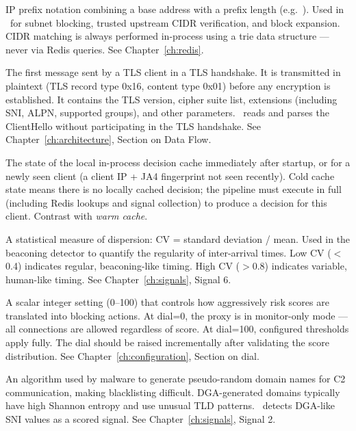 \begin{description}[leftmargin=0pt, style=nextline, itemsep=8pt]
  \item[CIDR (Classless Inter-Domain Routing)\index{CIDR}]
  IP prefix notation combining a base address with a prefix length (e.g.\
  ). Used in \ja\ for subnet blocking, trusted upstream CIDR
  verification, and block expansion. CIDR matching is always performed in-process
  using a trie data structure — never via Redis queries.
  See Chapter~\ref{ch:redis}.

  \item[ClientHello\index{ClientHello}]
  The first message sent by a TLS client in a TLS handshake. It is transmitted in
  plaintext (TLS record type 0x16, content type 0x01) before any encryption is
  established. It contains the TLS version, cipher suite list, extensions (including
  SNI, ALPN, supported groups), and other parameters. \ja\ reads and parses the
  ClientHello without participating in the TLS handshake.
  See Chapter~\ref{ch:architecture}, Section on Data Flow.

  \item[Cold cache\index{cold cache}]
  The state of the local in-process decision cache immediately after startup, or
  for a newly seen client (a client IP + JA4 fingerprint not seen recently). Cold
  cache state means there is no locally cached decision; the pipeline must execute
  in full (including Redis lookups and signal collection) to produce a decision for
  this client.
  Contrast with \textit{warm cache}.

  \item[Coefficient of variation (CV)\index{coefficient of variation}]
  A statistical measure of dispersion: CV = standard deviation / mean. Used in the
  beaconing detector to quantify the regularity of inter-arrival times. Low CV
  ($<$0.4) indicates regular, beaconing-like timing. High CV ($>$0.8) indicates
  variable, human-like timing.
  See Chapter~\ref{ch:signals}, Signal 6.

  \item[Dial\index{dial}]
  A scalar integer setting (0–100) that controls how aggressively risk scores are
  translated into blocking actions. At dial=0, the proxy is in monitor-only mode —
  all connections are allowed regardless of score. At dial=100, configured thresholds
  apply fully. The dial should be raised incrementally after validating the score
  distribution.
  See Chapter~\ref{ch:configuration}, Section on dial.

  \item[DGA (Domain Generation Algorithm)\index{DGA}]
  An algorithm used by malware to generate pseudo-random domain names for C2
  communication, making blacklisting difficult. DGA-generated domains typically
  have high Shannon entropy and use unusual TLD patterns. \ja\ detects DGA-like
  SNI values as a scored signal.
  See Chapter~\ref{ch:signals}, Signal 2.


\end{description}
